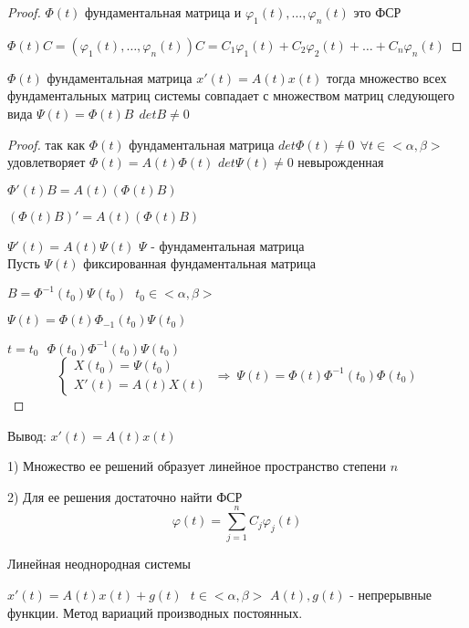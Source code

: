 \begin{proof}
  $\Phi(t)$ фундаментальная матрица и $\varphi_1(t), \ldots, \varphi_n(t)$
  это ФСР

  $\Phi(t)C = (\varphi_1(t), \ldots, \varphi_n(t))C = C_1 \varphi_1(t) +
  C_2 \varphi_2(t) + \ldots + C_n \varphi_n(t)$
\end{proof}

\begin{block}[Утверждение]
  $\Phi(t)$ фундаментальная матрица $x'(t) = A(t)x(t)$ тогда множество всех
  фундаментальных матриц системы совпадает с множеством матриц следующего вида
  $\Psi(t) = \Phi(t)B ~~ detB \not= 0$
\end{block}

\begin{proof}
  так как $\Phi(t)$ фундаментальная матрица $det\Phi(t) \not= 0 ~~
  \forall t \in <\alpha, \beta>$ удовлетворяет $\Phi(t) = A(t)\Phi(t)$
  $det\Psi(t) \not= 0$ невырожденная

  $\Phi'(t)B = A(t)(\Phi(t)B)$

  $(\Phi(t)B)' = A(t)(\Phi(t)B)$

  $\Psi'(t) = A(t)\Psi(t)$ $\Psi$ - фундаментальная матрица \\

  Пусть $\Psi(t)$ фиксированная фундаментальная матрица

  $B = \Phi^{-1}(t_0) \Psi(t_0) ~~~ t_0 \in <\alpha, \beta>$

  $\Psi(t) = \Phi(t) \Phi_{-1}(t_0) \Psi(t_0)$

  $t = t_0 ~~~ \Phi(t_0) \Phi^{-1}(t_0) \Psi(t_0)$
  $$
  \left\{
  \begin{array}{c}
    X(t_0) = \Psi(t_0) \\
    X'(t) = A(t)X(t)
  \end{array}
  \right. ~ \Rightarrow ~
  \Psi(t) = \Phi(t) \Phi^{-1}(t_0)\Phi(t_0)
  $$
\end{proof}

Вывод: $x'(t) = A(t)x(t)$

1) Множество ее решений образует линейное пространство степени $n$

2) Для ее решения достаточно найти ФСР
$$
\varphi(t) = \sum_{j=1}^n C_j \varphi_j(t)
$$

\begin{title}[\Large]
  Линейная неоднородная системы
\end{title}

$x'(t) = A(t) x(t) + g(t) ~~~ t \in <\alpha, \beta>$ $A(t), g(t)$ -
непрерывные функции. Метод вариаций производных постоянных.

